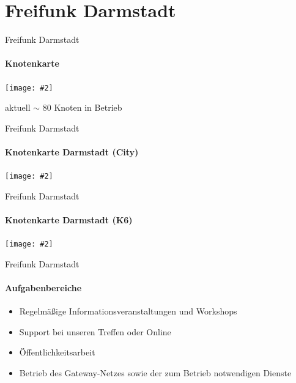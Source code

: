 \documentclass[]{beamer}
\newcommand{\centeredimage}[2][ ]{
        \begin{center}
            \texttt{[image: \#2]} $\;$

            \tiny{#1}
        \end{center}
}
\begin{document}
\section{Freifunk Darmstadt}
\begin{frame}{Freifunk Darmstadt}
\framesubtitle{Knotenkarte}
\centeredimage[ \pause aktuell $\sim$ 80 Knoten in Betrieb]{images/ffmap_darmstadt}
\end{frame}

\begin{frame}{Freifunk Darmstadt}
\framesubtitle{Knotenkarte Darmstadt (City)}
\centeredimage{images/ffmap_darmstadt_city}
\end{frame}

\begin{frame}{Freifunk Darmstadt}
\framesubtitle{Knotenkarte Darmstadt (K6)}
\centeredimage{images/ffmap_darmstadt_k6}
\end{frame}

\begin{frame}{Freifunk Darmstadt}
\framesubtitle{Aufgabenbereiche}
\begin{itemize}
\item Regelmäßige Informationsveranstaltungen und Workshops \pause
\item Support bei unseren Treffen oder Online \pause
\item Öffentlichkeitsarbeit \pause
\item Betrieb des Gateway-Netzes sowie der zum Betrieb notwendigen Dienste
\end{itemize}
\end{frame}
\end{document}

